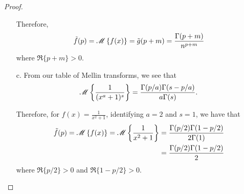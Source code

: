 \begin{proof}
\begin{enumerate}
      Therefore,
      \begin{align*}
        \tilde{f}(p) = \mathscr{M}\left\{ {f(x)} \right\} = \tilde{g}(p + m) = \frac{\Gamma(p + m)}{n^{p+m}}
      \end{align*}
      where $\Re{\{p + m\}} > 0$.

    \item[c.] From our table of Mellin transforms,
      we see that
      \begin{align*}
        \mathscr{M}\left\{ {\frac{1}{(x^a + 1)^s}} \right\} = \frac{\Gamma(p/a)\Gamma(s - p/a)}{a \Gamma(s)}.
      \end{align*}

      Therefore, for $f(x) = \frac{1}{x^2 + 1}$, identifying $a = 2$ and $s = 1$, we have that
      \begin{align*}
        \tilde{f}(p) = \mathscr{M}\left\{ {f(x)} \right\} = \mathscr{M}\left\{ {\frac{1}{x^2 + 1}} \right\}
        &= \frac{\Gamma(p/2)\Gamma(1 - p/2)}{2 \Gamma(1)} \\
        &= \frac{\Gamma(p/2)\Gamma(1 - p/2)}{2 }
      \end{align*}
      where $\Re{\{p/2\}} > 0$ and $\Re{\{1-p/2\}} > 0$.

  \end{enumerate}
\end{proof}
\newpage
